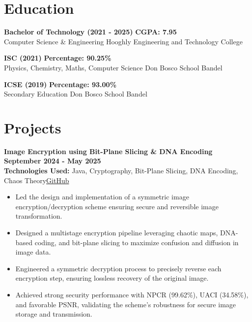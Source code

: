 \documentclass[a4paper,10pt]{article}
\begin{document}
\section*{Education}
\textbf{Bachelor of Technology (2021 - 2025)} \hfill {\textbf{CGPA: 7.95}} \\
Computer Science \& Engineering \hfill Hooghly Engineering and Technology College %

\vspace{0.5em}

\textbf{ISC (2021)} \hfill {\textbf{Percentage: 90.25\%}} \\
Physics, Chemistry, Maths, Computer Science \hfill Don Bosco School Bandel

\vspace{0.5em}

\textbf{ICSE (2019)} \hfill {\textbf{Percentage: 93.00\%}} \\
Secondary Education \hfill Don Bosco School Bandel






\section*{Projects}
\textbf{Image Encryption using Bit-Plane Slicing \& DNA Encoding} \hfill {\textbf{September 2024 - May 2025}}\\[0.5em]
\textbf{Technologies Used:} Java, Cryptography, Bit-Plane Slicing, DNA Encoding, Chaos Theory\hfill {\href{https://github.com/subhrasmit17/Image-Encryption-Offline}{GitHub}}

\begin{itemize}[leftmargin=*]
    \item Led the design and implementation of a symmetric image encryption/decryption scheme ensuring secure and reversible image transformation.
    \item Designed a multistage encryption pipeline leveraging chaotic maps, DNA-based coding, and bit-plane slicing to maximize confusion and diffusion in image data.
    \item Engineered a symmetric decryption process to precisely reverse each encryption step, ensuring lossless recovery of the original image.
    \item Achieved strong security performance with NPCR (99.62\%), UACI (34.58\%), and favorable PSNR, validating the scheme's robustness for secure image storage and transmission.
\end{itemize}
\end{document}
